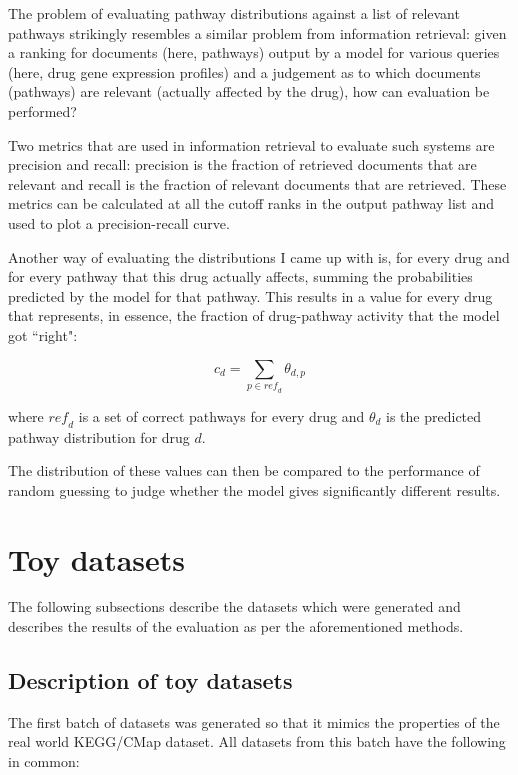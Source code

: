 \documentclass[12pt,a4paper,twoside,openright]{report}
\begin{document}
The problem of evaluating pathway distributions against a list of relevant pathways strikingly resembles a similar problem from information retrieval: given a ranking for documents (here, pathways) output by a model for various queries (here, drug gene expression profiles) and a judgement as to which documents (pathways) are relevant (actually affected by the drug), how can evaluation be performed?

Two metrics that are used in information retrieval to evaluate such systems are precision and recall: precision is the fraction of retrieved documents that are relevant and recall is the fraction of relevant documents that are retrieved. These metrics can be calculated at all the cutoff ranks in the output pathway list and used to plot a precision-recall curve.

Another way of evaluating the distributions I came up with is, for every drug and for every pathway that this drug actually affects, summing the probabilities predicted by the model for that pathway. This results in a value for every drug that represents, in essence, the fraction of drug-pathway activity that the model got ``right":

\begin{equation}
c_d = \sum\limits_{p \in \mathit{ref}_d}{\theta_{d, p}}
\end{equation}

where $\mathit{ref}_d$ is a set of correct pathways for every drug and $\theta_d$ is the predicted pathway distribution for drug $d$.

The distribution of these values can then be compared to the performance of random guessing to judge whether the model gives significantly different results.

\section{Toy datasets}

The following subsections describe the datasets which were generated and describes the results of the evaluation as per the aforementioned methods.

\subsection{Description of toy datasets}

The first batch of datasets was generated so that it mimics the properties of the real world KEGG/CMap dataset. All datasets from this batch have the following in common:
\end{document}
